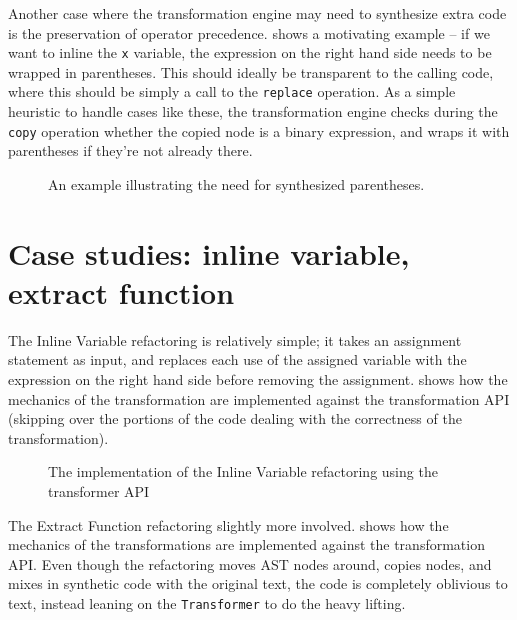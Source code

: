 Another case where the transformation engine may need to synthesize extra code
is the preservation of operator precedence.  shows
a motivating example -- if we want to inline the \texttt{x} variable, the
expression on the right hand side needs to be wrapped in parentheses. This
should ideally be transparent to the calling code, where this should be simply
a call to the \texttt{replace} operation. As a simple heuristic to handle cases
like these, the transformation engine checks during the \texttt{copy} operation
whether the copied node is a binary expression, and wraps it with parentheses
if they're not already there.

\begin{figure}
\begin{minipage}{0.5\linewidth}

\end{minipage}
\hfill \hspace{.3cm} \hfill
\begin{minipage}{0.5\linewidth}

\end{minipage}
\caption{An example illustrating the need for synthesized parentheses.}
\label{Fig:NeedParens}
\end{figure}

\section{Case studies: inline variable, extract function}

The Inline Variable refactoring is relatively simple; it takes an assignment
statement as input, and replaces each use of the assigned variable with the
expression on the right hand side before removing the assignment.
 shows how the mechanics of the transformation are
implemented against the transformation API (skipping over the portions of the
code dealing with the correctness of the transformation).

\begin{figure}

\caption{The implementation of the Inline Variable refactoring using the transformer API}
\label{Fig:InlineVariable}
\end{figure}

The Extract Function refactoring slightly more involved.
 shows how the mechanics of the transformations are
implemented against the transformation API. Even though the refactoring moves
AST nodes around, copies nodes, and mixes in synthetic code with the original text,
the code is completely oblivious to text, instead leaning on the {\tt Transformer}
to do the heavy lifting.

